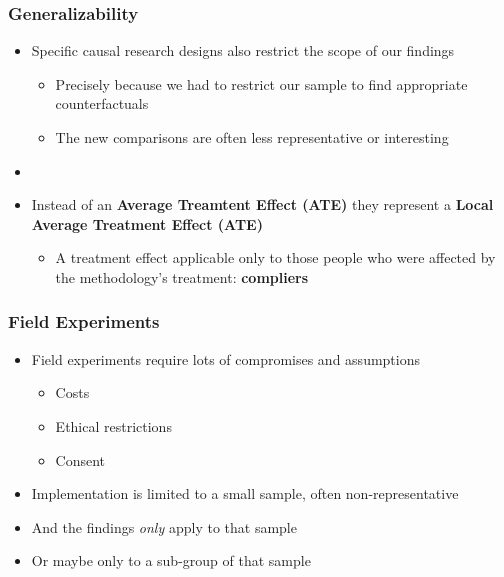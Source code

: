 \documentclass[xcolor=x11names,compress]{beamer}\usepackage[]{graphicx}\usepackage[]{color}
\renewcommand{\(}{\begin{columns}}
\renewcommand{\)}{\end{columns}}
\newcommand{\<}[1]{\begin{column}{#1}}
\renewcommand{\>}{\end{column}}
\begin{document}
\begin{frame}
\frametitle{Generalizability}
\begin{itemize}
\item Specific causal research designs also restrict the scope of our findings
\begin{itemize}
\item Precisely because we had to restrict our sample to find appropriate counterfactuals
\item The new comparisons are often less representative or interesting
\end{itemize}
\item \item Instead of an \textbf{Average Treamtent Effect (ATE)} they represent a \textbf{Local Average Treatment Effect (ATE)}
\begin{itemize}
\item A treatment effect applicable only to those people who were affected by the methodology's treatment: \textbf{compliers}
\end{itemize}
\end{itemize}
\end{frame}

\begin{frame}
\frametitle{Field Experiments}
\begin{itemize}
\item Field experiments require lots of compromises and assumptions
\begin{itemize}
\item Costs
\item Ethical restrictions
\item Consent
\end{itemize}
\item Implementation is limited to a small sample, often non-representative
\item And the findings \textit{only} apply to that sample
\item Or maybe only to a sub-group of that sample
\end{itemize}
\end{frame}
\end{document}
